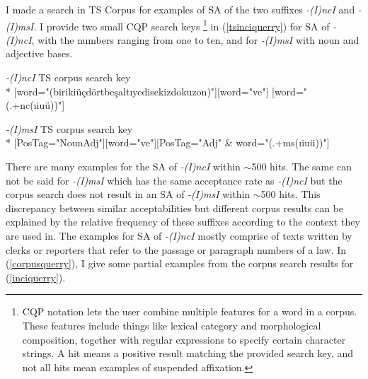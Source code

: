 I made a search in TS Corpus \citep{sezer2013ts} for examples of SA of the two suffixes \textit{-(I)ncI} and \textit{-(I)msI}. I provide two small CQP search keys \citep{hardie2012cqpweb}\footnote{CQP notation lets the user combine multiple features for a word in a corpus. These features include things like lexical category and morphological composition, together with regular expressions to specify certain character strings. A hit means a positive result matching the provided search key, and not all hits mean examples of suspended affixation.} in (\ref{tsinciquerry}) for SA of \textit{-(I)ncI}, with the numbers ranging from one to ten, and for \textit{-(I)msI} with noun and adjective bases.

\begin{exe}
\ex \label{tsinciquerry}
\begin{xlist}
\ex \label{inciquerry}\textit{-(I)ncI} TS corpus search key\\*
{[word="(bir{\textbar}iki{\textbar}üç{\textbar}dört{\textbar}beş{\textbar}altı{\textbar}yedi{\textbar}sekiz{\textbar}dokuz{\textbar}on)"][word="ve"]}
{[word="(.+nc(ı{\textbar}i{\textbar}u{\textbar}ü))"]}

\ex \textit{-(I)msI} TS corpus search key\\*
{[PosTag="Noun{\textbar}Adj"][word="ve"][PosTag="Adj" \& word="(.+ms(ı{\textbar}i{\textbar}u{\textbar}ü))"]}
\end{xlist}
\end{exe}

There are many examples for the SA of \textit{-(I)ncI} within $\sim$500 hits. The same can not be said for \textit{-(I)msI} which has the same acceptance rate as \textit{-(I)ncI} but the corpus search does not result in an SA of \textit{-(I)msI} within $\sim$500 hits. This discrepancy between similar acceptabilities but different corpus results can be explained by the relative frequency of these suffixes according to the context they are used in. The examples for SA of \textit{-(I)ncI} mostly comprise of texts written by clerks or reporters that refer to the passage or paragraph numbers of a law. In (\ref{corpusquerry}), I give some partial examples from the corpus search results for (\ref{inciquerry}). 

